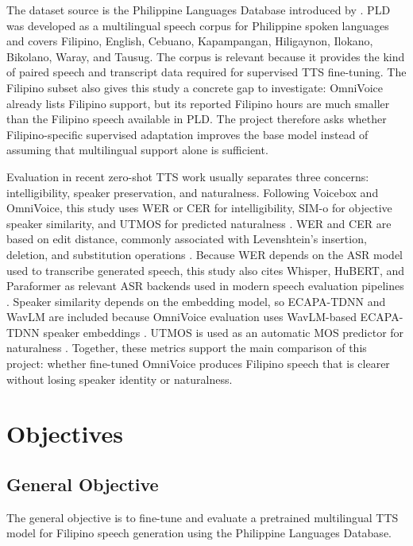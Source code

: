 \documentclass[11pt]{article}
\begin{document}
The dataset source is the Philippine Languages Database introduced by \citet{pld}. PLD was developed as a multilingual speech corpus for Philippine spoken languages and covers Filipino, English, Cebuano, Kapampangan, Hiligaynon, Ilokano, Bikolano, Waray, and Tausug. The corpus is relevant because it provides the kind of paired speech and transcript data required for supervised TTS fine-tuning. The Filipino subset also gives this study a concrete gap to investigate: OmniVoice already lists Filipino support, but its reported Filipino hours are much smaller than the Filipino speech available in PLD. The project therefore asks whether Filipino-specific supervised adaptation improves the base model instead of assuming that multilingual support alone is sufficient.

Evaluation in recent zero-shot TTS work usually separates three concerns: intelligibility, speaker preservation, and naturalness. Following Voicebox and OmniVoice, this study uses WER or CER for intelligibility, SIM-o for objective speaker similarity, and UTMOS for predicted naturalness \citep{omnivoice,voicebox}. WER and CER are based on edit distance, commonly associated with Levenshtein's insertion, deletion, and substitution operations \citep{levenshtein}. Because WER depends on the ASR model used to transcribe generated speech, this study also cites Whisper, HuBERT, and Paraformer as relevant ASR backends used in modern speech evaluation pipelines \citep{whisper,hubert,paraformer}. Speaker similarity depends on the embedding model, so ECAPA-TDNN and WavLM are included because OmniVoice evaluation uses WavLM-based ECAPA-TDNN speaker embeddings \citep{ecapatdnn,wavlm}. UTMOS is used as an automatic MOS predictor for naturalness \citep{utmos}. Together, these metrics support the main comparison of this project: whether fine-tuned OmniVoice produces Filipino speech that is clearer without losing speaker identity or naturalness.

\section{Objectives}

\subsection{General Objective}

The general objective is to fine-tune and evaluate a pretrained multilingual TTS model for Filipino speech generation using the Philippine Languages Database.
\end{document}
